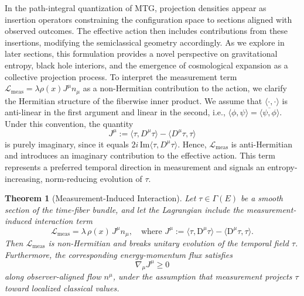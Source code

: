 \documentclass[11pt]{article}
\newtheorem{theorem}{Theorem}
\begin{document}
In the path-integral quantization of MTG, projection densities appear as insertion operators constraining the configuration space to sections aligned with observed outcomes. The effective action then includes contributions from these insertions, modifying the semiclassical geometry accordingly. As we explore in later sections, this formulation provides a novel perspective on gravitational entropy, black hole interiors, and the emergence of cosmological expansion as a collective projection process.
To interpret the measurement term $\mathcal{L}_{\text{meas}} = \lambda \rho(x) J^\mu n_\mu$ as a non-Hermitian contribution to the action, we clarify the Hermitian structure of the fiberwise inner product. We assume that $\langle \cdot, \cdot \rangle$ is anti-linear in the first argument and linear in the second, i.e., $\langle \phi, \psi \rangle = \overline{\langle \psi, \phi \rangle}$. Under this convention, the quantity
\[
J^\mu := \langle \tau, D^\mu \tau \rangle - \langle D^\mu \tau, \tau \rangle
\]
is purely imaginary, since it equals $2i\,\mathrm{Im} \langle \tau, D^\mu \tau \rangle$. Hence, $\mathcal{L}_{\text{meas}}$ is anti-Hermitian and introduces an imaginary contribution to the effective action. This term represents a preferred temporal direction in measurement and signals an entropy-increasing, norm-reducing evolution of $\tau$.
\begin{theorem}[Measurement-Induced Interaction]\label{thm:measure-ind-inter}
Let $\tau \in \Gamma(E)$ be a smooth section of the time-fiber bundle, and let the Lagrangian include the measurement-induced interaction term
\[
\mathcal{L}_{\mathrm{meas}} = \lambda \, \rho(x) \, J^\mu n_\mu,
\quad \text{where } J^\mu := \langle \tau, \mathrm{D}^\mu \tau \rangle - \langle \mathrm{D}^\mu \tau, \tau \rangle.
\]
Then $\mathcal{L}_{\mathrm{meas}}$ is non-Hermitian and breaks unitary evolution of the temporal field $\tau$. Furthermore, the corresponding energy-momentum flux satisfies
\[
\nabla_\mu J^\mu \geq 0
\]
along observer-aligned flow $n^\mu$, under the assumption that measurement projects $\tau$ toward localized classical values.
\end{theorem}
\end{document}
